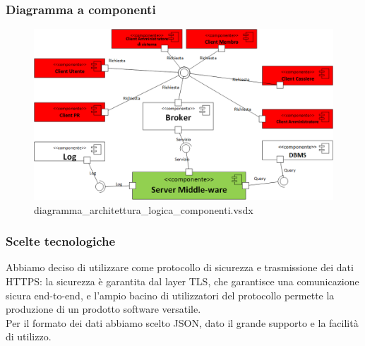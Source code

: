 \documentclass[a4paper]{article}
\begin{document}






\subsubsection{Diagramma a componenti}


\begin{figure}[H]
    \includegraphics[scale=0.55]{Progettazione/diagramma_architettura_logica_componenti.png}
    \centering
    \caption{diagramma\_architettura\_logica\_componenti.vsdx}
\end{figure}

\subsubsection{Scelte tecnologiche}
Abbiamo deciso di utilizzare come protocollo di sicurezza e trasmissione dei dati HTTPS: la sicurezza è garantita dal layer TLS, che garantisce una comunicazione sicura end-to-end, e l'ampio bacino di utilizzatori del protocollo permette la produzione di un prodotto software versatile.\\Per il formato dei dati abbiamo scelto JSON, dato il grande supporto e la facilità di utilizzo.
\end{document}
